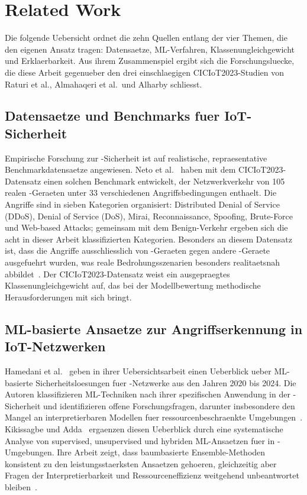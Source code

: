\section{Related Work}\label{related_work}

Die folgende Uebersicht ordnet die zehn Quellen entlang der vier Themen, die den eigenen Ansatz
tragen: Datensaetze, ML-Verfahren, Klassenungleichgewicht und Erklaerbarkeit.
Aus ihrem Zusammenspiel ergibt sich die Forschungsluecke, die diese Arbeit gegenueber den drei
einschlaegigen CICIoT2023-Studien von Raturi et al., Almahaqeri et al.\ und Alharby schliesst.

\subsection{Datensaetze und Benchmarks fuer IoT-Sicherheit}

Empirische Forschung zur \iot{}-Sicherheit ist auf realistische, repraesentative
Benchmarkdatensaetze angewiesen.
Neto et al.\ \cite{neto2023ciciot2023} haben mit dem CICIoT2023-Datensatz einen solchen
Benchmark entwickelt, der Netzwerkverkehr von 105 realen \iot{}-Geraeten unter 33
verschiedenen Angriffsbedingungen enthaelt.
Die Angriffe sind in sieben Kategorien organisiert: Distributed Denial of Service (DDoS),
Denial of Service (DoS), Mirai, Reconnaissance, Spoofing, Brute-Force und Web-based Attacks;
gemeinsam mit dem Benign-Verkehr ergeben sich die acht in dieser Arbeit klassifizierten
Kategorien.
Besonders an diesem Datensatz ist, dass die Angriffe ausschliesslich von \iot{}-Geraeten
gegen andere \iot{}-Geraete ausgefuehrt wurden, was reale Bedrohungsszenarien besonders
realitaetsnah abbildet~\cite{neto2023ciciot2023}.
Der CICIoT2023-Datensatz weist ein ausgepraegtes Klassenungleichgewicht auf, das bei der
Modellbewertung methodische Herausforderungen mit sich bringt.

\subsection{ML-basierte Ansaetze zur Angriffserkennung in IoT-Netzwerken}

Hamedani et al.\ \cite{hamedani2025iotsurvey} geben in ihrer Uebersichtsarbeit einen Ueberblick
ueber ML-basierte Sicherheitsloesungen fuer \iot{}-Netzwerke aus den Jahren 2020 bis 2024.
Die Autoren klassifizieren ML-Techniken nach ihrer spezifischen Anwendung in der
\iot{}-Sicherheit und identifizieren offene Forschungsfragen, darunter insbesondere den Mangel
an interpretierbaren Modellen fuer ressourcenbeschraenkte Umgebungen~\cite{hamedani2025iotsurvey}.
Kikissagbe und Adda~\cite{kikissagbe2024review} ergaenzen diesen Ueberblick durch eine
systematische Analyse von supervised, unsupervised und hybriden ML-Ansaetzen fuer \ids{} in
\iot{}-Umgebungen.
Ihre Arbeit zeigt, dass baumbasierte Ensemble-Methoden konsistent zu den
leistungsstaerksten Ansaetzen gehoeren, gleichzeitig aber Fragen der Interpretierbarkeit
und Ressourceneffizienz weitgehend unbeantwortet bleiben~\cite{kikissagbe2024review}.

